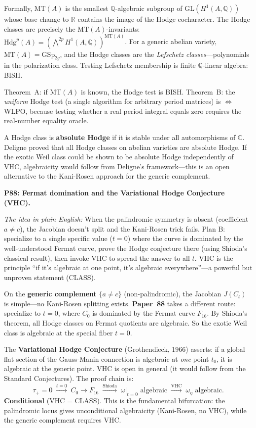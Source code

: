 \documentclass[11pt,twoside,openany]{report}
\theoremstyle{remark}
\newcommand{\BISH}{\textsf{BISH}}
\newcommand{\WLPO}{\textsf{WLPO}}
\newcommand{\CLASS}{\textsf{CLASS}}
\newcommand{\paperref}[1]{\textbf{Paper~#1}}
\begin{document}
Formally, $\mathrm{MT}(A)$ is the smallest $\mathbb{Q}$-algebraic subgroup of $\mathrm{GL}(H^1(A, \mathbb{Q}))$ whose base change to $\mathbb{R}$ contains the image of the Hodge cocharacter. The Hodge classes are precisely the $\mathrm{MT}(A)$-invariants: $\mathrm{Hdg}^p(A) = (\bigwedge^{2p} H^1(A,\mathbb{Q}))^{\mathrm{MT}(A)}$. For a generic abelian variety, $\mathrm{MT}(A) = \mathrm{GSp}_{2g}$, and the Hodge classes are the \emph{Lefschetz classes}---polynomials in the polarization class. Testing Lefschetz membership is finite $\mathbb{Q}$-linear algebra: \BISH.

Theorem~A: if $\mathrm{MT}(A)$ is known, the Hodge test is \BISH. Theorem~B: the \emph{uniform} Hodge test (a single algorithm for arbitrary period matrices) is $\Leftrightarrow$ \WLPO, because testing whether a real period integral equals zero requires the real-number equality oracle.

A Hodge class is \textbf{absolute Hodge} if it is stable under all automorphisms of $\mathbb{C}$. Deligne proved that all Hodge classes on abelian varieties are absolute Hodge. If the exotic Weil class could be shown to be absolute Hodge independently of VHC, algebraicity would follow from Deligne's framework---this is an open alternative to the Kani-Rosen approach for the generic complement.

\textbf{P88: Fermat domination and the Variational Hodge Conjecture (VHC).}

\emph{The idea in plain English:} When the palindromic symmetry is absent (coefficient $a \neq c$), the Jacobian doesn't split and the Kani-Rosen trick fails. Plan B: specialize to a single specific value ($t=0$) where the curve is dominated by the well-understood Fermat curve, prove the Hodge conjecture there (using Shioda's classical result), then invoke VHC to spread the answer to all $t$. VHC is the principle ``if it's algebraic at one point, it's algebraic everywhere''---a powerful but unproven statement (\CLASS).

On the \textbf{generic complement} $\{a \neq c\}$ (non-palindromic), the Jacobian $J(C_t)$ is simple---no Kani-Rosen splitting exists. \paperref{88} takes a different route: specialize to $t = 0$, where $C_0$ is dominated by the Fermat curve $F_{16}$. By Shioda's theorem, all Hodge classes on Fermat quotients are algebraic. So the exotic Weil class is algebraic at the special fiber $t = 0$.

The \textbf{Variational Hodge Conjecture} (Grothendieck, 1966) asserts: if a global flat section of the Gauss-Manin connection is algebraic at \emph{one} point $t_0$, it is algebraic at the generic point. VHC is open in general (it would follow from the Standard Conjectures). The proof chain is:
\[
  \tau_+ = 0 \;\xrightarrow{t=0}\; C_0 \to F_{16} \;\xrightarrow{\text{Shioda}}\; \omega|_{t=0} \text{ algebraic} \;\xrightarrow{\text{VHC}}\; \omega_\eta \text{ algebraic.}
\]
\textbf{Conditional} (VHC = \CLASS). This is the fundamental bifurcation: the palindromic locus gives unconditional algebraicity (Kani-Rosen, no VHC), while the generic complement requires VHC.
\end{document}
